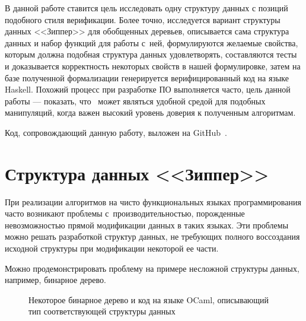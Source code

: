 В данной работе ставится цель исследовать одну структуру данных с позиций подобного стиля верификации. Более точно, исследуется вариант структуры данных <<Зиппер>> для обобщенных деревьев, описывается сама структура данных и набор функций для работы с~ней, формулируются желаемые свойства, которым должна подобная структура данных удовлетворять, составляются тесты и доказывается корректность некоторых свойств в нашей формулировке, затем на базе полученной формализации генерируется верифицированный код на языке Haskell. Похожий процесс при разработке ПО выполняется часто, цель данной работы --- показать, что \tcoq~может являться удобной средой для подобных манипуляций, когда важен высокий уровень доверия к полученным алгоритмам.

Код, сопровождающий данную работу, выложен на GitHub~\autocite{TheCode}.

\newpage

\section{Структура данных <<Зиппер>>}

При реализации алгоритмов на чисто функциональных языках программирования часто возникают проблемы с~производительностью, порожденные невозможностью прямой модификации данных в таких языках. Эти проблемы можно решать разработкой структур данных, не требующих полного воссоздания исходной структуры при модификации некоторой ее части.

Можно продемонстрировать проблему на примере несложной структуры данных, например, бинарное дерево. 

\begin{figure}[H]
\centering


\caption{Некоторое бинарное дерево и код на языке OCaml, описывающий тип соответствующей структуры данных}
\end{figure}

